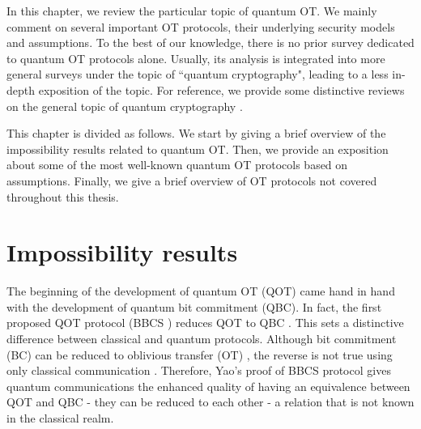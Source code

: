 In this chapter, we review the particular topic of quantum OT. We mainly comment on several important OT protocols, their underlying security models and assumptions. To the best of our knowledge, there is no prior survey dedicated to quantum OT protocols alone. Usually, its analysis is integrated into more general surveys under the topic of ``quantum cryptography", leading to a less in-depth exposition of the topic. For reference, we provide some distinctive reviews on the general topic of quantum cryptography \cite{BC96, B05, M06, F10, B15, PAB+20, PR21, SH22}.

This chapter is divided as follows. We start by giving a brief overview of the impossibility results related to quantum OT. Then, we provide an exposition about some of the most well-known quantum OT protocols based on assumptions. Finally, we give a brief overview of OT protocols not covered throughout this thesis.

\section{Impossibility results}

The beginning of the development of quantum OT (QOT) came hand in hand with the development of quantum bit commitment (QBC). In fact, the first proposed QOT protocol (BBCS \cite{BBCS92}) reduces QOT to QBC . This sets a distinctive difference between classical and quantum protocols. Although bit commitment (BC) can be reduced to oblivious transfer (OT) \cite{K88}, the reverse is not true using only classical communication \cite{S99}. Therefore, Yao's proof \cite{Y95} of BBCS protocol \cite{BBCS92} gives quantum communications the enhanced quality of having an equivalence between QOT and QBC - they can be reduced to each other - a relation that is not known in the classical realm.

